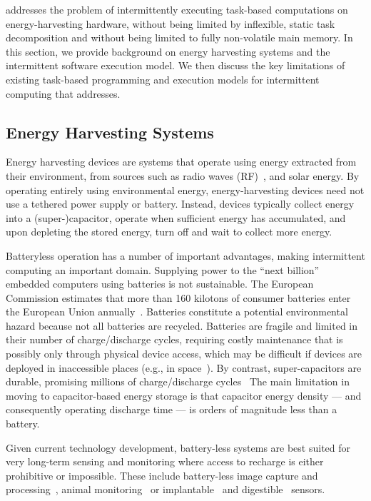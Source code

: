 \sys addresses the problem of intermittently executing task-based computations
on energy-harvesting hardware, without being limited by inflexible, static task
decomposition and without being limited to fully non-volatile main memory.  In
this section, we provide background on energy harvesting systems and the
intermittent software execution model.   We then discuss the key limitations of
existing task-based programming and execution models for intermittent computing
that \sys addresses.

\subsection{Energy Harvesting Systems}
\label{sec:background_harvesting}

Energy harvesting devices are systems that operate using energy extracted from
their environment, from sources such as radio waves (RF)~\cite{wisp}, and solar
energy.  By operating entirely using environmental energy, energy-harvesting
devices need not use a tethered power supply or battery.  Instead, devices
typically collect energy into a (super-)capacitor, operate when sufficient
energy has accumulated, and upon depleting the stored energy, turn off and wait
to collect more energy.  

Batteryless operation has a number of important advantages, making intermittent
computing an important domain.  Supplying power to the ``next
billion''~\cite{citationneeded} embedded computers using batteries is not
sustainable.  The European Commission estimates that more than 160 kilotons of
consumer batteries enter the European Union annually~\cite{eu_batteries_2016}.
Batteries constitute a potential environmental hazard because not all batteries
are recycled.  Batteries are fragile and limited in their number of
charge/discharge cycles, requiring costly maintenance that is possibly only
through physical device access, which may be difficult if devices are deployed
in inaccessible places (e.g., in space~\cite{kicksat}). By contrast,
super-capacitors are durable, promising millions of charge/discharge
cycles~\cite[Sec. I]{ongaro_pwre_2012} The main limitation in moving to
capacitor-based energy storage is that capacitor energy density --- and
consequently operating discharge time --- is orders of magnitude less than a
battery.

Given current technology development, battery-less systems are best suited for
very long-term sensing and monitoring where access to recharge is either
prohibitive or impossible. These include battery-less image capture and
processing~\cite{naderiparizi_rfid_2015}, animal monitoring~\cite{thomas_jbcs_2012} or implantable~\cite{rodriguez_tbcs_2015}
and digestible~\cite{nadeau_naturebio_2017} sensors.
 
